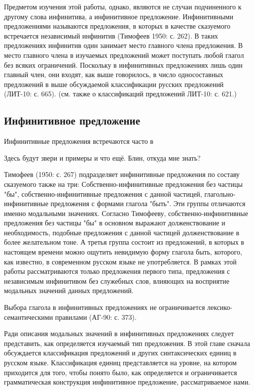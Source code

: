 Предметом изучения этой работы, однако, являются не случаи подчиненного к другому слова инфинитива, а инфинитивное предложение. Инфинитивными предложениями называются предложения, в которых в качестве сказуемого встречается независимый инфинитив (Тимофеев 1950: с. 262). В таких предложениях инфинитив один занимает место главного члена предложения. В место главного члена в изучаемых предложений может поступать любой глагол без всяких ограничений. Поскольку в инфинитивных предложениях лишь один главный член, они входят, как выше говорилось, в число односоставных предложений в выше обсуждаемой классификации русских предложений (ЛИТ-10: с. 665). (см. также о классификаций предложений ЛИТ-10: с. 621.)

\subsection{Инфинитивное предложение}

Инфинитивные предложения встречаются часто в 

Здесь будут звери и примеры и что ещё. Блин, откуда мне знать?	




Тимофеев (1950: с. 267) подразделяет инфинитивные предложения по составу сказуемого также на три: Собственно-инфинитивные предложения без частицы "бы", собственно-инфинитивные предложения с данной частицей, глагольно-инфинитивные предложения с формами глагола "быть". Эти группы отличаются именно модальными значениях. Согласно Тимофееву, собственно-инфинитивные предложения без частицы "бы" в основном выражают долженствование и необходимость, подобные предложения с данной частицей долженствование в более желательном тоне. А третья группа состоит из предложений, в которых в настоящем времени можно ощутить невидимую форму глагола быть, которого, как известно, в современном русском языке не употребляется. В рамках этой работы рассматриваются только предложения первого типа, предложения с независимым инфинитивом без служебных слов, влияющих на восприятие модальных значений данных предложений. 


Выбора глагола в инфинитивных предложениях не ограничивается лексико-семантическими правилами (АГ-90: с. 373).



Ради описания модальных значений в инфинитивных предложениях следует представить, как определяется изучаемый тип предложения. В этой главе сначала обсуждается классификация предложений и других синтаксических единиц в русском языке. Классификация единиц представляется на уровне, на котором приходится для того, чтобы понято было, как определяется и ограничивается грамматическая конструкция инфинитивное предложение, рассматриваемое нами.

